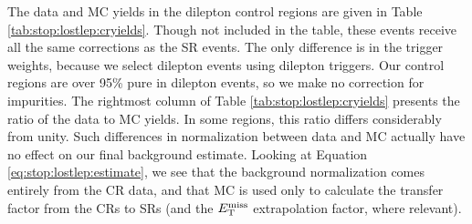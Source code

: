 The data and MC yields in the dilepton control regions are given in
Table \ref{tab:stop:lostlep:cryields}. Though not included in the %
table, these events receive all the same corrections as the SR
events. The only difference is in the trigger weights, because we
select dilepton events using dilepton triggers.
Our control regions are over 95\% pure in dilepton events,
so we make no correction for impurities. The rightmost column of Table
\ref{tab:stop:lostlep:cryields} presents the ratio of the data to MC
yields. In some regions, this ratio differs considerably from
unity. Such differences in normalization between data and MC
actually have no effect on our final background estimate. Looking at Equation
\ref{eq:stop:lostlep:estimate}, we see that the background
normalization comes entirely from the CR data, and that MC is used
only to calculate the transfer factor from the CRs to SRs (and the
$E_\text{T}^\text{miss}$ extrapolation factor, where relevant).

